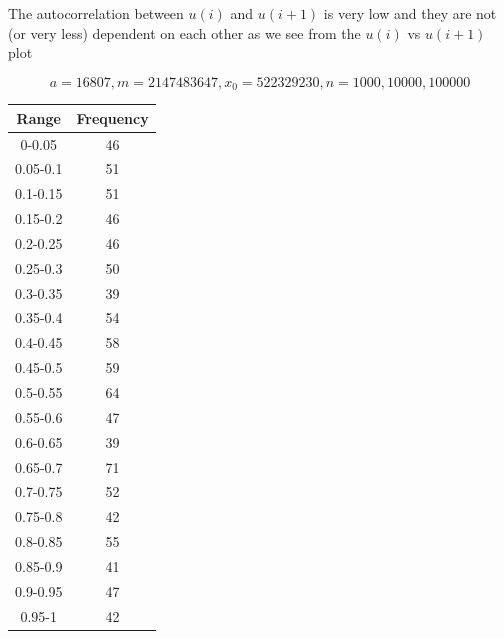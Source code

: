 \documentclass{article}
\begin{document}
The autocorrelation between $u(i)$ and $u(i+1)$ is very low and they are 
not (or very less) dependent on each other as we see from the $u(i)$ vs $u(i+1)$ plot
\begin{table}

$$a = 16807, m = 2147483647, x_0 = 522329230, n = 1000,10000,100000$$
\parbox{.3\linewidth}{
 \begin{tabular}{||c | c||}  \hline
		Range & Frequency \\ [0.5ex] \hline \hline0-0.05 & 46\\
		\hline 
		0.05-0.1 & 51\\
		\hline 
		0.1-0.15 & 51\\
		\hline 
		0.15-0.2 & 46\\
		\hline 
		0.2-0.25 & 46\\
		\hline 
		0.25-0.3 & 50\\
		\hline 
		0.3-0.35 & 39\\
		\hline 
		0.35-0.4 & 54\\
		\hline 
		0.4-0.45 & 58\\
		\hline 
		0.45-0.5 & 59\\
		\hline 
		0.5-0.55 & 64\\
		\hline 
		0.55-0.6 & 47\\
		\hline 
		0.6-0.65 & 39\\
		\hline 
		0.65-0.7 & 71\\
		\hline 
		0.7-0.75 & 52\\
		\hline 
		0.75-0.8 & 42\\
		\hline 
		0.8-0.85 & 55\\
		\hline 
		0.85-0.9 & 41\\
		\hline 
		0.9-0.95 & 47\\
		\hline 
		0.95-1 & 42\\
		\hline 
	\end{tabular} 
}
\parbox{.3\linewidth}{

}
\end{table}
\end{document}
